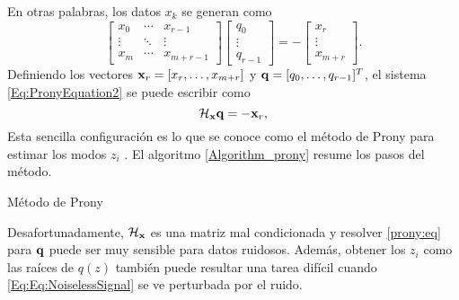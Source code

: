         En otras palabras, los datos $x_k$ se generan como
        \begin{equation}
            \begin{bmatrix}
                x_0 & \cdots & x_{r-1}\\[0.3em]
                \vdots & \ddots & \vdots \\[0.3em]
                x_{m} & \cdots & x_{m+r-1}
            \end{bmatrix}\begin{bmatrix} q_0 \\[0.3em]\vdots \\[0.3em]q_{r-1}
            \end{bmatrix}= - \begin{bmatrix} x_r\\[0.3em]\vdots \\[0.3em] x_{m+r}
            \end{bmatrix}.
            \label{Eq:PronyEquation2}
        \end{equation}
        Definiendo los vectores $\mathbf{x}_r=[x_r,\ldots,x_{m+r}]$ y $\mathbf{q} = [q_0, \ldots, q_{r-1}]^T$, el sistema \eqref{Eq:PronyEquation2} se puede escribir como 
	    \begin{equation}
		      \mathcal{H}_{\mathbf{x}} \mathbf{q} = -\mathbf{x}_r,
		      \label{prony:eq}
	       \end{equation}
        Esta sencilla configuración es lo que se conoce como el método de Prony para estimar los modos $z_i$ \cite{Prony1975}. El algoritmo \eqref{Algorithm_prony} resume los pasos del método.
	    \begin{algorithm}
		      \caption{Método de Prony}
		      \begin{algorithmic}[1]
		      \end{algorithmic}
		      \label{Algorithm_prony}
	    \end{algorithm} 
     
        Desafortunadamente, $\mathcal{H}_{\mathbf{x}}$ es una matriz mal condicionada y resolver \eqref{prony:eq} para $\mathbf{q}$ puede ser muy sensible para datos ruidosos. Además, obtener los $z_i$ como las raíces de $q(z)$ también puede resultar una tarea difícil cuando \eqref{Eq:Eq:NoiselessSignal} se ve perturbada por el ruido.

